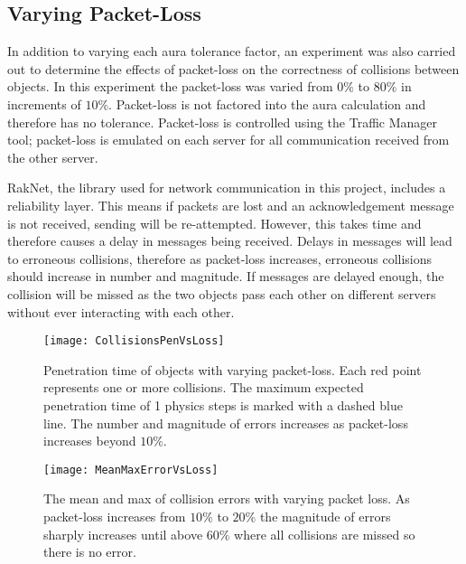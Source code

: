 \subsection{Varying Packet-Loss}

In addition to varying each aura tolerance factor, an experiment was also carried out to determine the effects of packet-loss on the correctness of collisions between objects. In this experiment the packet-loss was varied from $0\%$ to $80\%$ in increments of $10\%$. Packet-loss is not factored into the aura calculation and therefore has no tolerance. Packet-loss is controlled using the Traffic Manager tool; packet-loss is emulated on each server for all communication received from the other server.

RakNet, the library used for network communication in this project, includes a reliability layer. This means if packets are lost and an acknowledgement message is not received, sending will be re-attempted. However, this takes time and therefore causes a delay in messages being received. Delays in messages will lead to erroneous collisions, therefore as packet-loss increases, erroneous collisions should increase in number and magnitude. If messages are delayed enough, the collision will be missed as the two objects pass each other on different servers without ever interacting with each other. 


\begin{figure}[!t]
\centering
\texttt{[image: CollisionsPenVsLoss]}
\caption{Penetration time of objects with varying packet-loss. Each red point represents one or more collisions. The maximum expected penetration time of 1 physics steps is marked with a dashed blue line. The number and magnitude of errors increases as packet-loss increases beyond $10\%$.}
\label{fig_CollisionsPenVsLoss}
\end{figure}

\begin{figure}[!t]
\centering
\texttt{[image: MeanMaxErrorVsLoss]}
\caption{The mean and max of collision errors with varying packet loss. As packet-loss increases from $10\%$ to $20\%$ the magnitude of errors sharply increases until above $60\%$ where all collisions are missed so there is no error.}
\label{fig_MeanMaxErrorVsLoss}
\end{figure}

